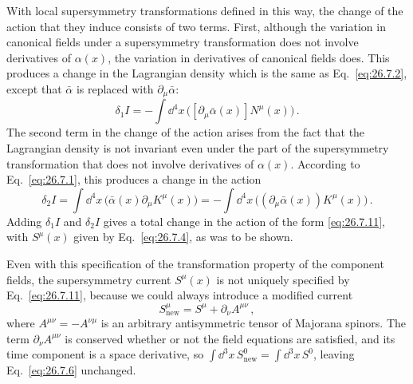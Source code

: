 With local supersymmetry transformations defined in this way, the change of
the action that they induce consists of two terms. First, although the
variation in canonical fields under a supersymmetry transformation does not
involve derivatives of \(\alpha(x)\), the variation in derivatives of
canonical fields does. This produces a change in the Lagrangian density which
is the same as Eq.~\eqref{eq:26.7.2}, except that \(\bar\alpha\) is replaced
with \(\partial_\mu\bar\alpha\):
\[
  \delta_1 I
  =-\int \dd^4x\,\bigl([\partial_\mu\bar\alpha(x)]N^\mu(x)\bigr)\,.
\]
The second term in the change of the action arises from the fact that the
Lagrangian density is not invariant even under the part of the supersymmetry
transformation that does not involve derivatives of \(\alpha(x)\). According
to Eq.~\eqref{eq:26.7.1}, this produces a change in the action
\[
  \delta_2 I
  =\int \dd^4x\,\bigl(\bar\alpha(x)\partial_\mu K^\mu(x)\bigr)
  =-\int \dd^4x\,\bigl((\partial_\mu\bar\alpha(x))K^\mu(x)\bigr)\,.
\]
Adding \(\delta_1 I\) and \(\delta_2 I\) gives a total change in the action of
the form \eqref{eq:26.7.11}, with \(S^\mu(x)\) given by
Eq.~\eqref{eq:26.7.4}, as was to be shown.

Even with this specification of the transformation property of the component
fields, the supersymmetry current \(S^\mu(x)\) is not uniquely specified by
Eq.~\eqref{eq:26.7.11}, because we could always introduce a modified current
\begin{equation}
  S_{\mathrm{new}}^\mu=S^\mu+\partial_\nu A^{\mu\nu}\,,
  \tag{26.7.16}\label{eq:26.7.16}
\end{equation}
where \(A^{\mu\nu}=-A^{\nu\mu}\) is an arbitrary antisymmetric tensor of
Majorana spinors. The term \(\partial_\nu A^{\mu\nu}\) is conserved whether
or not the field equations are satisfied, and its time component is a space
derivative, so \(\int \dd^3x\,S_{\mathrm{new}}^0=\int \dd^3x\,S^0\), leaving
Eq.~\eqref{eq:26.7.6} unchanged.

